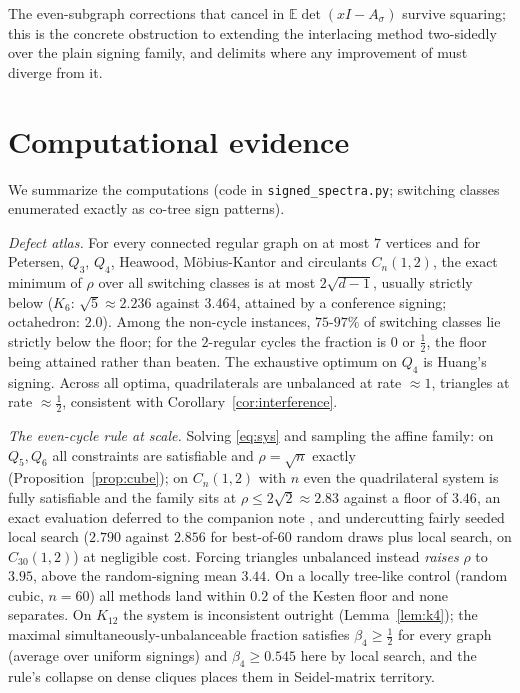 \documentclass[11pt]{article}
\theoremstyle{remark}
\newcommand{\rhomax}{\rho}
\begin{document}
The even-subgraph corrections that cancel in
$\mathbb{E}\det(xI-A_\sigma)$ survive squaring; this is the concrete
obstruction to extending the interlacing method two-sidedly over the
plain signing family, and delimits where any improvement of
\cite{xuzhang26} must diverge from it.

\section{Computational evidence}\label{sec:experiments}

We summarize the computations (code in \texttt{signed\_spectra.py};
switching classes enumerated exactly as co-tree sign patterns).

\emph{Defect atlas.} For every connected regular graph on at most $7$
vertices and for Petersen, $Q_3$, $Q_4$, Heawood, M\"obius-Kantor and
circulants $C_n(1,2)$, the exact minimum of $\rhomax$ over all switching
classes is at most $2\sqrt{d-1}$, usually strictly below
($K_6$: $\sqrt5\approx2.236$ against $3.464$, attained by a conference
signing; octahedron: $2.0$). Among the non-cycle instances, $75$-$97\%$ of switching classes lie
strictly below the floor; for the $2$-regular cycles the fraction is
$0$ or $\tfrac12$, the floor being attained rather than beaten. The exhaustive optimum on $Q_4$ is
Huang's signing. Across all optima, quadrilaterals are unbalanced at
rate $\approx1$, triangles at rate $\approx\tfrac12$, consistent with
Corollary~\ref{cor:interference}.

\emph{The even-cycle rule at scale.} Solving \eqref{eq:sys} and sampling
the affine family: on $Q_5,Q_6$ all constraints are satisfiable and
$\rhomax=\sqrt n$ exactly (Proposition~\ref{prop:cube}); on $C_n(1,2)$ with $n$ even the
quadrilateral system is fully satisfiable and the family sits at
$\rhomax\le2\sqrt2\approx2.83$ against a floor of $3.46$, an exact evaluation deferred to the companion note
\cite{companion}, and undercutting fairly seeded local search
($2.790$ against $2.856$ for best-of-$60$ random draws plus local
search, on $C_{30}(1,2)$) at negligible cost. Forcing triangles
unbalanced instead \emph{raises} $\rhomax$ to $3.95$, above the
random-signing mean $3.44$. On a locally tree-like control (random
cubic, $n=60$) all methods land within $0.2$ of the Kesten floor and
none separates. On $K_{12}$ the system is inconsistent outright (Lemma~\ref{lem:k4});
the maximal simultaneously-unbalanceable fraction satisfies
$\beta_4\ge\tfrac12$ for every graph (average over uniform signings)
and $\beta_4\ge0.545$ here by local search, and the rule's collapse on
dense cliques places them in Seidel-matrix territory.
\end{document}
